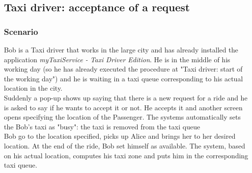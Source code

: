 \pagebreak
\subsection{Taxi driver: acceptance of a request}
\subsubsection{Scenario}
Bob is a Taxi driver that works in the large city and has already installed the application \textit{myTaxiService - Taxi Driver Edition}.
He is in the middle of his working day (so he has already executed the procedure at "Taxi driver: start of the working day") and he is waiting in a taxi queue corresponding to his actual location in the city.\\
Suddenly a pop-up shows up saying that there is a new request for a ride and he is asked to say if he wants to accept it or not.
He accepts it and another screen opens specifying the location of the Passenger. The systems automatically sets the Bob's taxi as "busy": the taxi is removed from the taxi queue\\
Bob go to the location specified, picks up Alice and brings her to her desired location. At the end of the ride, Bob set himself as available. The system, based on his actual location, computes his taxi zone and puts him in the corresponding taxi queue.

